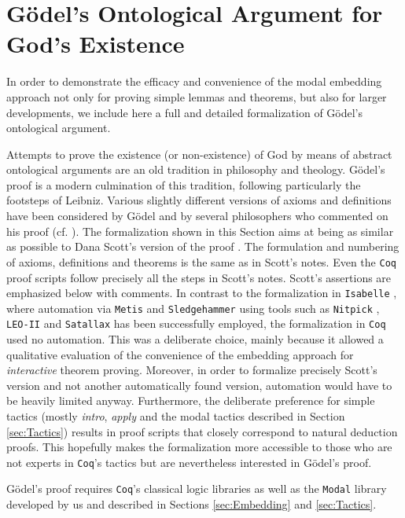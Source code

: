 \documentclass{llncs}
\newcommand{\Coq}{\texttt{Coq}\xspace}
\newcommand{\Isabelle}{\texttt{Isabelle}\xspace}
\begin{document}
\section{G\"odel's Ontological Argument for God's Existence}
\label{sec:proof}

In order to demonstrate the efficacy and convenience of the modal
embedding approach not only for proving simple lemmas and theorems,
but also for larger developments, we include here a full and detailed
formalization of Gödel's ontological argument.

Attempts to prove the existence (or non-existence) of God by means of
abstract ontological arguments are an old tradition in philosophy and
theology. G\"{o}del's proof \cite{Goedel1970,GoedelNotes} is a modern
culmination of this tradition, following particularly the footsteps of
Leibniz. Various slightly different versions of axioms and definitions
have been considered by G\"{o}del and by several philosophers who
commented on his proof (cf.
\cite{sobel2004logic,AndersonGettings,Fitting,Adams,ContemporaryBibliography}).
The formalization shown in this Section aims at being as similar as
possible to Dana Scott's version of the proof \cite{ScottNotes}. The
formulation and numbering of axioms, definitions and theorems is the
same as in Scott's notes. Even the \Coq proof scripts follow precisely
all the steps in Scott's notes. Scott's assertions are emphasized
below with comments. In contrast to the formalization in \Isabelle
\cite{AFP}, where automation via \texttt{Metis}
\cite{Hurd03first-orderproof} and \texttt{Sledgehammer}
\cite{Sledgehammer} using tools such as \texttt{Nitpick}
\cite{Nitpick}, \texttt{LEO-II} \cite{LEO-II} and \texttt{Satallax}
\cite{Satallax} has been successfully employed, the formalization in
\Coq used no automation. This was a deliberate choice, mainly because
it allowed a qualitative evaluation of the convenience of the
embedding approach for \emph{interactive} theorem proving. Moreover,
in order to formalize precisely Scott's version and not another
automatically found version, automation would have to be heavily
limited anyway. Furthermore, the deliberate preference for simple
tactics (mostly \emph{intro}, \emph{apply} and the modal tactics
described in Section \ref{sec:Tactics}) results in proof scripts that
closely correspond to natural deduction proofs. This hopefully makes
the formalization more accessible to those who are not experts in
\Coq's tactics but are nevertheless interested in G\"odel's proof.

Gödel's proof requires \Coq's classical logic libraries as well as the
\texttt{Modal} library developed by us and described in Sections
\ref{sec:Embedding} and \ref{sec:Tactics}.
\end{document}
